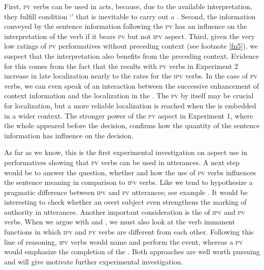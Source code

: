 \documentclass[output=paper,colorlinks,citecolor=brown,newtxmath,hidelinks]{langscibook}
\begin{document}
First, \textsc{pv}  verbs can be used in  acts, because, due to the available  interpretation, they fulfill condition ‘’ that is inevitable to carry out a . Second, the information conveyed by the sentence information following the \textsc{pv}  has an influence on the interpretation of the verb if it bears \textsc{pv} but not \textsc{ipv} aspect. Third, given the very low ratings of \textsc{pv} performatives without preceding context (see footnote \ref{fn5}), we suspect that the  interpretation also benefits from the preceding context. Evidence for this comes from the fact that the results with \textsc{pv} verbs in Experiment 2 increase in late  localization nearly to the rates for the \textsc{ipv} verbs. In the case of \textsc{pv}  verbs, we can even speak of an interaction between the successive enhancement of context information and the localization in the . The \textsc{pv}  by itself may be crucial for  localization, but a more reliable localization is reached when the  is embedded in a wider context. The stronger  power of the \textsc{pv} aspect in Experiment 1, where the whole  appeared before the decision, confirms how the quantity of the sentence information has influence on the decision.

As far as we know, this is the first experimental investigation on aspect use in  performatives showing that \textsc{pv}  verbs can be used in  utterances. A next step would be to answer the question, whether and how the use of \textsc{pv}  verbs influences the sentence meaning in comparison to \textsc{ipv}  verbs.  Like \citeauthor{Israeli2001} we tend to hypothesize a pragmatic difference between \textsc{ipv} and \textsc{pv}  utterances; see example . It would be interesting to check whether an overt subject even strengthens the marking of authority in  utterances. Another important consideration is the   of \textsc{ipv} and \textsc{pv}  verbs. When we argue with \citet{Breu1980} and \citet{Dewit2017}, we must also look at the verb immanent  functions in which \textsc{ipv} and \textsc{pv}  verbs are different from each other. Following this line of reasoning, \textsc{ipv}  verbs would name and perform the  event, whereas a \textsc{pv}  would emphasize the completion of the . Both approaches are well worth pursuing and will give motivate further experimental investigation.
\end{document}
